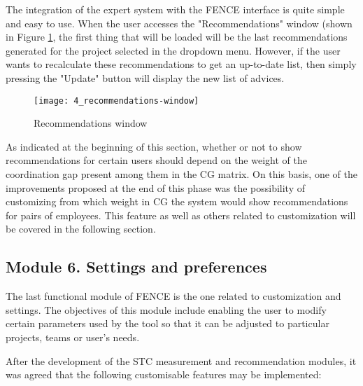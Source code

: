 The integration of the expert system with the FENCE interface is quite simple and easy to use. When the user accesses the "Recommendations" window (shown in Figure \ref{fig:recommendations}, the first thing that will be loaded will be the last recommendations generated for the project selected in the dropdown menu. However, if the user wants to recalculate these recommendations to get an up-to-date list, then simply pressing the "Update" button will display the new list of advices.

	\begin{figure}
		\centering
		\texttt{[image: 4\_recommendations-window]}
		\caption[Recommendations window]{Recommendations window}
		\label{fig:recommendations}
	\end{figure}

As indicated at the beginning of this section, whether or not to show recommendations for certain users should depend on the weight of the coordination gap present among them in the CG matrix. On this basis, one of the improvements proposed at the end of this phase was the possibility of customizing from which weight in CG the system would show recommendations for pairs of employees. This feature as well as others related to customization will be covered in the following section.

\subsection{Module 6. Settings and preferences}

The last functional module of FENCE is the one related to customization and settings. The objectives of this module include enabling the user to modify certain parameters used by the tool so that it can be adjusted to particular projects, teams or user’s needs.

After the development of the STC measurement and recommendation modules, it was agreed that the following customisable features may be implemented:

